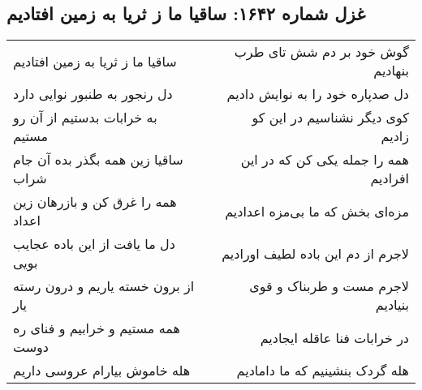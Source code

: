 \begin{center}
\section*{غزل شماره ۱۶۴۲: ساقیا ما ز ثریا به زمین افتادیم}
\label{sec:1642}
\begin{longtable}{l p{0.5cm} r}
ساقیا ما ز ثریا به زمین افتادیم
&&
گوش خود بر دم شش تای طرب بنهادیم
\\
دل رنجور به طنبور نوایی دارد
&&
دل صدپاره خود را به نوایش دادیم
\\
به خرابات بدستیم از آن رو مستیم
&&
کوی دیگر نشناسیم در این کو زادیم
\\
ساقیا زین همه بگذر بده آن جام شراب
&&
همه را جمله یکی کن که در این افرادیم
\\
همه را غرق کن و بازرهان زین اعداد
&&
مزه‌ای بخش که ما بی‌مزه اعدادیم
\\
دل ما یافت از این باده عجایب بویی
&&
لاجرم از دم این باده لطیف اورادیم
\\
از برون خسته یاریم و درون رسته یار
&&
لاجرم مست و طربناک و قوی بنیادیم
\\
همه مستیم و خرابیم و فنای ره دوست
&&
در خرابات فنا عاقله ایجادیم
\\
هله خاموش بیارام عروسی داریم
&&
هله گردک بنشینیم که ما دامادیم
\\
\end{longtable}
\end{center}
